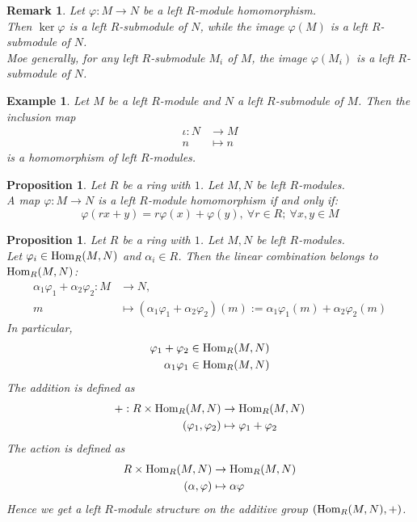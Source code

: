 \documentclass[a4paper,8pt]{article}
\newcommand{\hlt}[1]{\textit{{\color{blue}#1}}}
\newcommand{\homs}[1]{\textnormal{Hom}#1}
\theoremstyle{theorem}
\newtheorem{proposition}[theorem]{Proposition}
\newtheorem{example}[theorem]{Example}
\newtheorem{remark}[theorem]{Remark}
\begin{document}
\begin{remark}
Let $\varphi: M \rightarrow N$ be a left $R$-module homomorphism.\\
Then $\ker \varphi$ is a left $R$-submodule of $N$, while the image $\varphi(M)$ is a left $R$-submodule of $N$.\\
Moe generally, for any left $R$-submodule $M_i$ of $M$, the image $\varphi(M_i)$ is a left $R$-submodule of $N$.
\end{remark}

\begin{example}
Let $M$ be a left $R$-module and $N$ a left $R$-submodule of $M$. Then the inclusion map
\begin{align}
\iota: N &\rightarrow M \nonumber \\
n &\mapsto n \nonumber
\end{align}
is a homomorphism of left $R$-modules.
\end{example}

\begin{proposition}
Let $R$ be a ring with $1$. Let $M, N$ be left $R$-modules.\\
A map $\varphi: M \rightarrow N$ is a left $R$-module homomorphism if and only if:
\begin{equation}
\varphi(rx+y) = r\varphi(x) + \varphi(y), \ \forall r \in R; \ \forall x, y \in M \nonumber
\end{equation}
\end{proposition}

\begin{proposition}
Let $R$ be a ring with $1$. Let $M, N$ be left $R$-modules.\\
Let $\varphi_i \in \homs_R(M,N)$ and $\alpha_i \in R$. Then the \hlt{linear combination} belongs to $\homs_R(M,N)$:
\begin{align}
\alpha_1 \varphi_1 + \alpha_2 \varphi_2: M &\rightarrow N, \nonumber \\
m &\mapsto (\alpha_1 \varphi_1 + \alpha_2 \varphi_2)(m) := \alpha_1 \varphi_1(m) + \alpha_2 \varphi_2(m) \nonumber
\end{align}
In particular, 
\begin{align}
\varphi_1 + \varphi_2 &\in \homs_R(M,N) \nonumber \\
\alpha_1 \varphi_1 &\in \homs_R(M,N) \nonumber
\end{align}
The addition is defined as
\begin{align}
+ : R \times \homs_R(M,N) &\rightarrow \homs_R(M,N) \nonumber \\
(\varphi_1, \varphi_2) &\mapsto \varphi_1 + \varphi_2 \nonumber
\end{align}
The action is defined as
\begin{align}
R \times \homs_R(M,N) &\rightarrow \homs_R(M,N) \nonumber \\
(\alpha, \varphi) &\mapsto \alpha \varphi \nonumber
\end{align}
Hence we get a left $R$-module structure on the additive group $(\homs_R(M,N), +)$.
\end{proposition}
\end{document}
